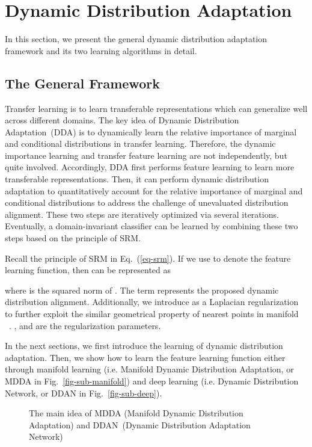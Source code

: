 \documentclass[acmsmall]{acmart}
\begin{document}
\section{Dynamic Distribution Adaptation}
\label{sec-method}

In this section, we present the general dynamic distribution adaptation framework and its two learning algorithms in detail.

\subsection{The General Framework}
Transfer learning is to learn transferable representations which can generalize well across different domains. The key idea of Dynamic Distribution Adaptation~(DDA) is to dynamically learn the relative importance of marginal and conditional distributions in transfer learning. Therefore, the dynamic importance learning and transfer feature learning are not independently, but quite involved. Accordingly, DDA first performs feature learning to learn more transferable representations. Then, it can perform dynamic distribution adaptation to quantitatively account for the relative importance of marginal and conditional distributions to address the challenge of unevaluated distribution alignment. These two steps are iteratively optimized via several iterations. Eventually, a domain-invariant classifier  can be learned by combining these two steps based on the principle of SRM. 

Recall the principle of SRM in Eq.~(\ref{eq-srm}). If we use  to denote the feature learning function, then  can be represented as


where  is the squared norm of . The term  represents the proposed dynamic distribution alignment. Additionally, we introduce  as a Laplacian regularization to further exploit the similar geometrical property of nearest points in manifold ~\cite{belkin2006manifold}. , and  are the regularization parameters.

In the next sections, we first introduce the learning of dynamic distribution adaptation. Then, we show how to learn the feature learning function  either through manifold learning (i.e. Manifold Dynamic Distribution Adaptation, or MDDA in Fig.~\ref{fig-sub-manifold}) and deep learning (i.e. Dynamic Distribution Network, or DDAN in Fig.~\ref{fig-sub-deep}).



\begin{figure}[t!]
	\centering
	\hspace{.3in}
	
	\caption{The main idea of MDDA (Manifold Dynamic Distribution Adaptation) and DDAN~(Dynamic Distribution Adaptation Network)}
	\label{fig-main}
\end{figure}
\end{document}
